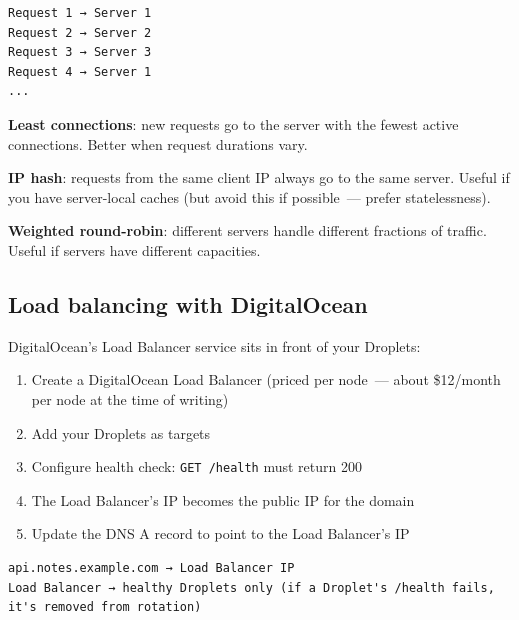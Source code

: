 \begin{outputbox}[short]
\begin{Verbatim}[fontsize=\codesize, breaklines, breakanywhere, breaksymbolleft={\tiny\textcolor{muted}{$\hookrightarrow$}}]
Request 1 → Server 1
Request 2 → Server 2
Request 3 → Server 3
Request 4 → Server 1
...
\end{Verbatim}
\end{outputbox}

\noindent{}\textbf{Least connections}: new requests go to the server with the fewest active connections. Better when request durations vary.

\textbf{IP hash}: requests from the same client IP always go to the same server. Useful if you have server-local caches (but avoid this if possible~--- prefer statelessness).

\textbf{Weighted round-robin}: different servers handle different fractions of traffic. Useful if servers have different capacities.

\subsection*{Load balancing with DigitalOcean}\label{36-scaling-load:load-balancing-with-digitalocean}

DigitalOcean's Load Balancer service sits in front of your Droplets:

\begin{enumerate}
\def\labelenumi{\arabic{enumi}.}
\tightlist
\item
  Create a DigitalOcean Load Balancer (priced per node~--- about \$12/month per node at the time of writing)
\item
  Add your Droplets as targets
\item
  Configure health check: \texttt{GET\ /health} must return 200
\item
  The Load Balancer's IP becomes the public IP for the domain
\item
  Update the DNS A record to point to the Load Balancer's IP
\end{enumerate}

\begin{outputbox}[short]
\begin{Verbatim}[fontsize=\codesize, breaklines, breakanywhere, breaksymbolleft={\tiny\textcolor{muted}{$\hookrightarrow$}}]
api.notes.example.com → Load Balancer IP
Load Balancer → healthy Droplets only (if a Droplet's /health fails, it's removed from rotation)
\end{Verbatim}
\end{outputbox}

